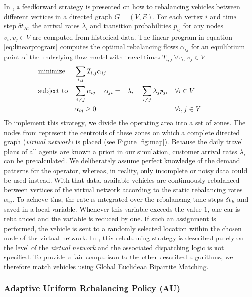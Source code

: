 In \citep{pavone2011load}, a feedforward strategy is presented on how to rebalancing vehicles between different vertices in a directed graph $G = (V,E)$. For each vertex $i$ and time step $\delta t_R$, the arrival rates $\lambda_i$ and transition probabilities $p_{ij}$ for any nodes $v_i, v_j \in V$  are computed from historical data. The linear program in equation \ref{eq:linearprogram} computes the optimal rebalancing flows $\alpha _{ij}$ for an equilibrium point of the underlying flow
model with travel times $T_{i,j}\ \forall v_i, v_j \in V$. 
\begin{align}
&\textnormal{minimize}& &\sum_{i,j} T_{i,j} \alpha _{ij} & && && \nonumber \\
&\textnormal{subject to}&
&\sum_{i \neq j} \alpha _{ij} - \alpha _{ji} =-\lambda_i  + \sum_{i \neq j} \lambda_j p_{ji}
& &\forall i \in V &\label{eq:linearprogram} \\
&& &\alpha_{ij} \geq 0& & \forall i, j \in V& \nonumber
\end{align}
To implement this strategy, we divide the operating area into a set of zones. The nodes from \cite{pavone2011load} represent the centroids of these zones on
which a complete directed graph (\textit{virtual network}) is placed (see Figure \ref{fig:map}). Because the daily travel plans of all agents are known a priori in our simulation, customer arrival rates $\lambda_i$ can be precalculated. We deliberately assume perfect knowledge of the demand patterns for the operator, whereas, in reality, only incomplete or noisy data could be used instead. With that data, available vehicles are continuously rebalanced between vertices of the virtual network according to the static rebalancing rates  $\alpha_{ij}$. To achieve this, the rate is integrated over the rebalancing time steps $\delta t_R$ and saved in a local variable. Whenever this variable exceeds the value $1$, one car is rebalanced and the variable is reduced by one. If such an assignment is performed, the vehicle is sent to a randomly selected location within the chosen node of the virtual network. In \cite{pavone2011load}, this rebalancing strategy is described purely on the level of the \textit{virtual network} and the associated dispatching logic is not specified. To provide a fair comparison to the other described algorithms, we therefore match vehicles using Global Euclidean Bipartite Matching.

\subsubsection{Adaptive Uniform Rebalancing Policy (AU)}

